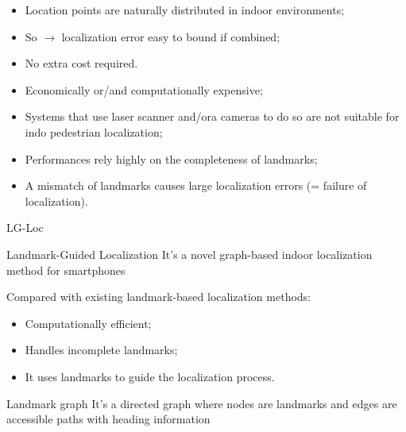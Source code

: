 \begin{frame}
 
    \begin{itemize}
        \item Location points are naturally distributed in indoor environments;\item So $\rightarrow$ localization error easy to bound if combined;\item No extra cost required.
    \end{itemize}

    \begin{itemize}
        \item Economically or/and computationally expensive;
        \item Systems that use laser scanner and/ora cameras to do so are not suitable for indo pedestrian localization;
        \item Performances rely highly on the completeness of landmarks;
        \item A mismatch of landmarks causes large localization errors (= failure of localization).
    \end{itemize}
\end{frame}

\begin{frame}{LG-Loc}
    \begin{block}{Landmark-Guided Localization}
        It's a novel graph-based indoor localization method for smartphones
    \end{block}

    Compared with existing landmark-based localization methods:
    \begin{itemize}
        \item Computationally efficient;
        \item Handles incomplete landmarks;
        \item It uses landmarks to guide the localization process.
    \end{itemize}

    \begin{block}{Landmark graph}
        It's a directed graph where nodes are landmarks and edges are accessible paths with heading information
    \end{block}
\end{frame}

